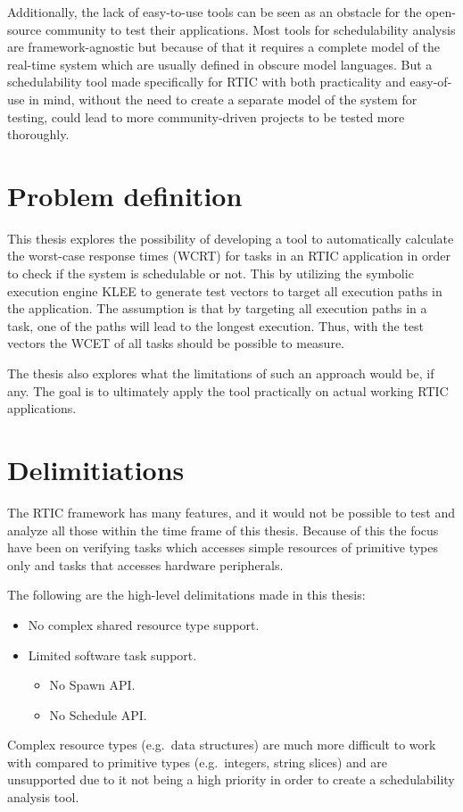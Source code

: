 Additionally, the lack of easy-to-use tools can be seen as an obstacle for the
open-source community to test their applications. Most tools for schedulability
analysis are framework-agnostic but because of that it requires a complete
model of the real-time system which are usually defined in obscure model
languages. But a schedulability tool made specifically for RTIC with both
practicality and easy-of-use in mind, without the need to create a separate
model of the system for testing, could lead to more community-driven projects
to be tested more thoroughly.

\section{Problem definition}
This thesis explores the possibility of developing a tool to automatically
calculate the worst-case response times (WCRT) for tasks in an RTIC application
in order to check if the system is schedulable or not. This by utilizing the
symbolic execution engine KLEE to generate test vectors to target all execution
paths in the application. The assumption is that by targeting all execution
paths in a task, one of the paths will lead to the longest execution. Thus,
with the test vectors the WCET of all tasks should be possible to measure.

The thesis also explores what the limitations of such an approach would be, if
any. The goal is to ultimately apply the tool practically on actual working
RTIC applications.

\section{Delimitiations}
The RTIC framework has many features, and it would not be possible to test and
analyze all those within the time frame of this thesis. Because of this the
focus have been on verifying tasks which accesses simple resources of primitive
types only and tasks that accesses hardware peripherals.

The following are the high-level delimitations made in this thesis:
\begin{itemize}
    \item No complex shared resource type support.
    \item Limited software task support.
    \begin{itemize}
        \item No Spawn API\@.
        \item No Schedule API\@.
    \end{itemize}
\end{itemize}
Complex resource types (e.g.\ data structures) are much more difficult to work
with compared to primitive types (e.g.\ integers, string slices) and are
unsupported due to it not being a high priority in order to create a
schedulability analysis tool.

